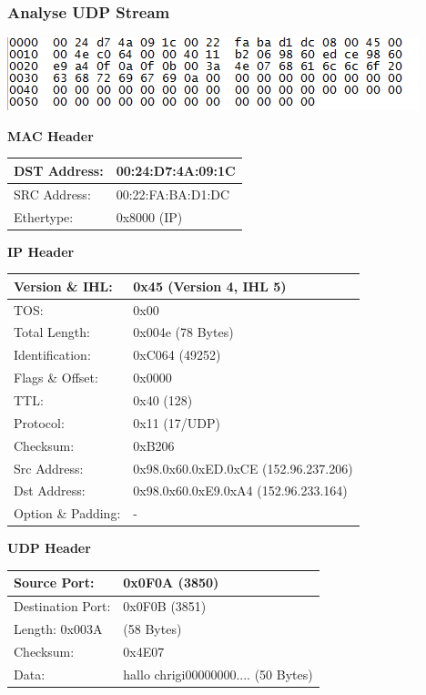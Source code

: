 \subsubsection{Analyse UDP Stream}

\includegraphics[scale=1.0]{media/UDPStream.png}

\textbf{MAC Header}

\begin{tabular}[h]{|l|l|}
	\hline
	DST Address: & 00:24:D7:4A:09:1C \\
	\hline
	SRC Address: & 00:22:FA:BA:D1:DC \\
	\hline
	Ethertype: & 0x8000 (IP) \\
	\hline
\end{tabular}

\textbf{IP Header}

\begin{tabular}[h]{|l|l|}
	\hline
	Version \& IHL: & 0x45 (Version 4, IHL 5) \\
	\hline
	TOS: & 0x00 \\
	\hline
	Total Length: & 0x004e (78 Bytes) \\
	\hline
	Identification: & 0xC064 (49252) \\
	\hline
	Flags \& Offset: & 0x0000 \\
	\hline
	TTL: & 0x40 (128) \\
	\hline
	Protocol: & 0x11 (17/UDP) \\
	\hline
	Checksum: & 0xB206 \\
	\hline
	Src Address: & 0x98.0x60.0xED.0xCE (152.96.237.206) \\
	\hline
	Dst Address: & 0x98.0x60.0xE9.0xA4 (152.96.233.164) \\
	\hline
	Option \& Padding: & - \\
	\hline
\end{tabular}

\textbf{UDP Header}

\begin{tabular}[h]{|l|l|}
	\hline
	Source Port: & 0x0F0A (3850) \\
	\hline
	Destination Port: & 0x0F0B (3851) \\
	\hline
	Length: 0x003A & (58 Bytes) \\
	\hline
	Checksum: & 0x4E07 \\
	\hline
	Data: & hallo chrigi00000000.... (50 Bytes) \\
	\hline
\end{tabular}

